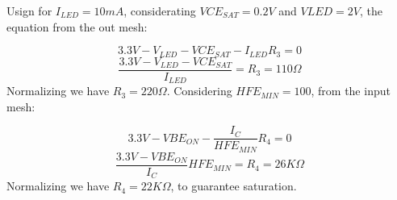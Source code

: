 Usign for $I_{LED} = 10mA$, considerating $VCE_{SAT} = 0.2V$ 
and $V{LED} = 2V$, the equation from the out mesh:

$$3.3V - V_{LED} - VCE_{SAT} - I_{LED}R_3 = 0$$
$$\frac{3.3V - V_{LED} - VCE_{SAT}}{I_{LED}} = R_3 = 110\Omega$$
Normalizing we have $R_3 = 220\Omega$.
Considering $HFE_{MIN} = 100$, from the input mesh:

$$3.3V - VBE_{ON} - \frac{I_C}{HFE_{MIN}}R_4 = 0$$
$$\frac{3.3V - VBE_{ON}}{I_C}HFE_{MIN} = R_4 = 26K\Omega$$
Normalizing we have $R_4 = 22K\Omega$, to guarantee saturation.

